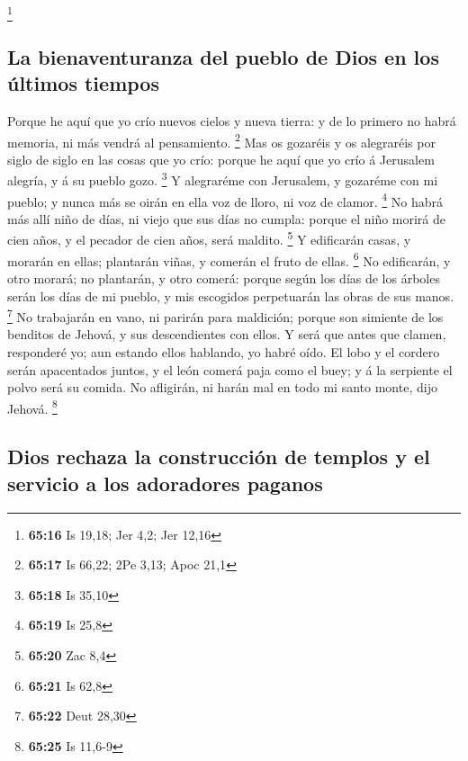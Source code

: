 \footnote{\textbf{65:16} Is 19,18; Jer 4,2; Jer 12,16}

\hypertarget{la-bienaventuranza-del-pueblo-de-dios-en-los-uxfaltimos-tiempos}{%
\subsection{La bienaventuranza del pueblo de Dios en los últimos
tiempos}\label{la-bienaventuranza-del-pueblo-de-dios-en-los-uxfaltimos-tiempos}}

 Porque he aquí que yo crío nuevos cielos y nueva tierra:
y de lo primero no habrá memoria, ni más vendrá al pensamiento.
\footnote{\textbf{65:17} Is 66,22; 2Pe 3,13; Apoc 21,1} 
Mas os gozaréis y os alegraréis por siglo de siglo en las cosas que yo
crío: porque he aquí que yo crío á Jerusalem alegría, y á su pueblo
gozo. \footnote{\textbf{65:18} Is 35,10}  Y alegraréme
con Jerusalem, y gozaréme con mi pueblo; y nunca más se oirán en ella
voz de lloro, ni voz de clamor. \footnote{\textbf{65:19} Is 25,8}
 No habrá más allí niño de días, ni viejo que sus días no
cumpla: porque el niño morirá de cien años, y el pecador de cien años,
será maldito. \footnote{\textbf{65:20} Zac 8,4}  Y
edificarán casas, y morarán en ellas; plantarán viñas, y comerán el
fruto de ellas. \footnote{\textbf{65:21} Is 62,8}  No
edificarán, y otro morará; no plantarán, y otro comerá: porque según los
días de los árboles serán los días de mi pueblo, y mis escogidos
perpetuarán las obras de sus manos. \footnote{\textbf{65:22} Deut 28,30}
 No trabajarán en vano, ni parirán para maldición; porque
son simiente de los benditos de Jehová, y sus descendientes con ellos.
 Y será que antes que clamen, responderé yo; aun estando
ellos hablando, yo habré oído.  El lobo y el cordero
serán apacentados juntos, y el león comerá paja como el buey; y á la
serpiente el polvo será su comida. No afligirán, ni harán mal en todo mi
santo monte, dijo Jehová. \footnote{\textbf{65:25} Is 11,6-9}

\hypertarget{dios-rechaza-la-construcciuxf3n-de-templos-y-el-servicio-a-los-adoradores-paganos}{%
\subsection{Dios rechaza la construcción de templos y el servicio a los
adoradores
paganos}\label{dios-rechaza-la-construcciuxf3n-de-templos-y-el-servicio-a-los-adoradores-paganos}}

